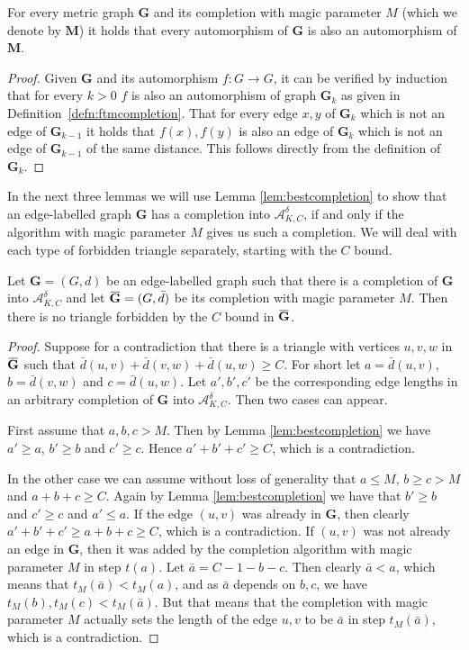 \documentclass[11pt]{amsart}
\newcommand{\overbar}[1]{\mkern 1.5mu\overline{\mkern-1.5mu#1\mkern-1.5mu}\mkern 1.5mu}
\def\str#1{\mathbf {#1}}
\begin{document}
\begin{lemma}
\label{lem:aut}
For every metric graph $\str{G}$ and its completion with magic parameter $M$ (which we denote by $\str{M}$) it holds that
every automorphism of $\str{G}$ is also an automorphism of $\str{M}$.
\end{lemma}
\begin{proof}
Given $\str{G}$ and its automorphism $f\colon G\to G$, it can be verified by induction that for every $k>0$ $f$ is also an automorphism of graph $\str{G}_k$ as given in Definition~\ref{defn:ftmcompletion}.
That for every edge $x,y$ of $\str{G}_k$ which is not an edge of $\str{G}_{k-1}$ it holds that $f(x),f(y)$
is also an edge of $\str{G}_k$ which is not an edge of $\str{G}_{k-1}$ of the same distance. This follows
directly from the definition of $\str{G}_k$.
\end{proof}

In the next three lemmas we will use Lemma \ref{lem:bestcompletion} to show that an edge-labelled graph  $\str{G}$ has a completion into $\mathcal A^\delta_{K,C}$, if and only if the algorithm with magic parameter $M$ gives us such a completion. We will deal with each type of forbidden triangle separately, starting with the $C$ bound.

\begin{lemma}
Let $\str{G}=(G,d)$ be an edge-labelled graph such that there is a completion of $\str{G}$ into $\mathcal A^\delta_{K,C}$ and let $\overbar{\str{G}}=(G,\bar{d})$ be its completion with magic parameter $M$. Then there is no triangle forbidden by the $C$ bound in $\overbar{\str{G}}$.
\end{lemma}
\begin{proof}
Suppose for a contradiction that there is a triangle with vertices $u,v,w$ in $\overbar{\str{G}}$ such that $\bar{d}(u,v)+\bar{d}(v,w)+\bar{d}(u,w)\geq C$. For short let $a=\bar{d}(u,v)$, $b=\bar{d}(v,w)$ and $c=\bar{d}(u,w)$. Let $a',b',c'$ be the corresponding edge lengths in an arbitrary completion of $\str{G}$ into $\mathcal A^\delta_{K,C}$. Then two cases can appear. 

First assume that $a,b,c > M$. Then by Lemma \ref{lem:bestcompletion} we have $a'\geq a$, $b'\geq b$ and $c'\geq c$. Hence $a' + b' + c' \geq C$, which is a contradiction.

In the other case we can assume without loss of generality that $a\leq M$, $b\geq c>M$ and $a+b+c\geq C$. Again by Lemma \ref{lem:bestcompletion} we have that $b'\geq b$ and $c'\geq c$ and $a'\leq a$. If the edge $(u,v)$ was already in $\str{G}$, then clearly $a' + b' + c' \geq a+b+c\geq C$, which is a contradiction. If $(u,v)$ was not already an edge in $\str{G}$, then it was added by the completion algorithm with magic parameter $M$ in step $t(a)$. Let $\bar{a}=C-1-b-c$. Then clearly $\bar{a}<a$, which means that $t_M(\bar{a}) < t_M(a)$, and as $\bar{a}$ depends on $b,c$, we have $t_M(b),t_M(c)<t_M(\bar{a})$. But that means that the completion with magic parameter $M$ actually sets the length of the edge $u,v$ to be $\bar{a}$ in step $t_M(\bar{a})$, which is a contradiction.
\end{proof}
\end{document}
